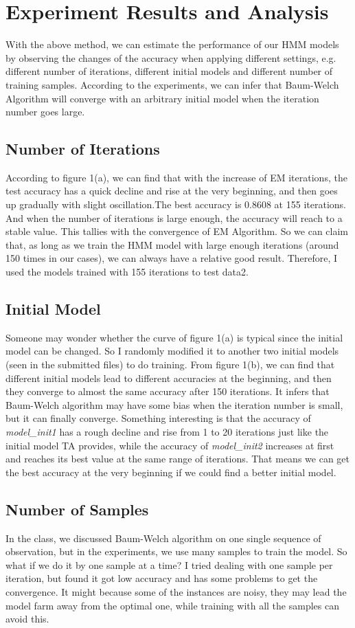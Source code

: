 \documentclass[11pt, oneside]{article}   	%
\begin{document}
\section{Experiment Results and Analysis}
With the above method, we can estimate the performance of our HMM models by observing the changes of the accuracy when applying different settings, e.g. different number of iterations, different initial models and different number of training samples. According to the experiments, we can infer that Baum-Welch Algorithm will converge with an arbitrary initial model when the iteration number goes large.
\subsection{Number of Iterations}
According to figure 1(a), we can find that with the increase of EM iterations, the test accuracy has a quick decline and rise at the very beginning,  and then goes up gradually with slight oscillation.The best accuracy is 0.8608 at 155 iterations. And when the number of iterations is large enough, the accuracy will reach to a stable value. This tallies with the convergence of EM Algorithm. So we can claim that, as long as we train the HMM model with large enough iterations (around 150 times in our cases), we can always have a relative good result.  Therefore, I used the models trained with 155 iterations to test data2.
\subsection{Initial Model}
Someone may wonder whether the curve of figure 1(a) is typical since the initial model can be changed. So I randomly modified it to another two initial models (seen in the submitted files) to do training. From figure 1(b), we can find that different initial models lead to different accuracies at the beginning, and then they converge to almost the same accuracy after 150 iterations. It infers that Baum-Welch algorithm may have some bias when the iteration number is small, but it can finally converge. Something interesting is that the accuracy of \emph{model\_init1} has a rough decline and rise from 1 to 20 iterations just like the initial model TA provides, while the accuracy of \emph{model\_init2}  increases at first and reaches its best value at the same range of iterations. That means we can get the best accuracy at the very beginning if we could find a better initial model.
\subsection{Number of Samples}
In the class, we discussed Baum-Welch algorithm on one single sequence of observation, but in the experiments, we use many samples to train the model. So what if we do it by one sample at a time? I tried dealing with one sample per iteration,  but found it got low accuracy and has some problems to get the convergence. It might because some of the instances are noisy, they may lead the model farm away from the optimal one, while training with all the samples can avoid this.
\end{document}

